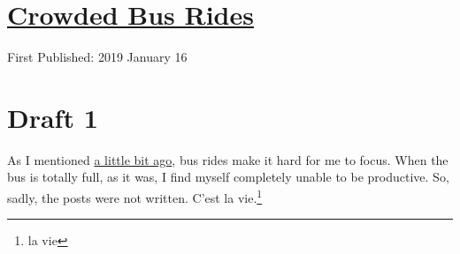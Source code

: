 \documentclass[12pt]{article}[titlepage]
\newcommand{\1}{\={a}}
\newcommand{\2}{\={e}}
\newcommand{\3}{\={\i}}
\newcommand{\4}{\=o}
\newcommand{\5}{\=u}
\newcommand{\6}{\={A}}
\renewcommand{\,}{\textsuperscript{,}}
\begin{document}
\doublespacing
\section{\href{crowded-bus-rides.html}{Crowded Bus Rides}}
First Published: 2019 January 16
\section{Draft 1}
As I mentioned \href{bus-rides.html}{a little bit ago}, bus rides make it hard for me to focus.
When the bus is totally full, as it was, I find myself completely unable to be productive.
So, sadly, the posts were not written.
C'est la vie.\footnote{la vie}
\end{document}
